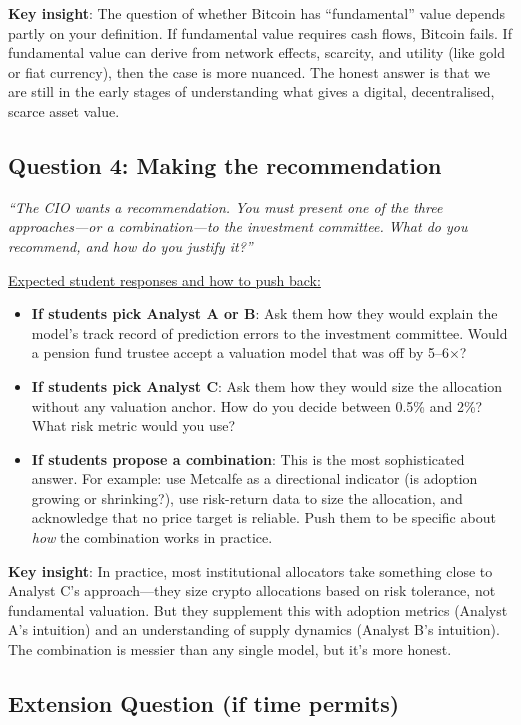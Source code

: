 \documentclass[11pt]{article}
\begin{document}
\medskip
\noindent\textbf{Key insight}: The question of whether Bitcoin has ``fundamental'' value depends partly on your definition. If fundamental value requires cash flows, Bitcoin fails. If fundamental value can derive from network effects, scarcity, and utility (like gold or fiat currency), then the case is more nuanced. The honest answer is that we are still in the early stages of understanding what gives a digital, decentralised, scarce asset value.

\subsection*{Question 4: Making the recommendation}

\textit{``The CIO wants a recommendation. You must present one of the three approaches---or a combination---to the investment committee. What do you recommend, and how do you justify it?''}

\medskip
\noindent\underline{Expected student responses and how to push back:}
\begin{itemize}[leftmargin=*]
\item \textbf{If students pick Analyst A or B}: Ask them how they would explain the model's track record of prediction errors to the investment committee. Would a pension fund trustee accept a valuation model that was off by 5--6$\times$?
\item \textbf{If students pick Analyst C}: Ask them how they would size the allocation without any valuation anchor. How do you decide between 0.5\% and 2\%? What risk metric would you use?
\item \textbf{If students propose a combination}: This is the most sophisticated answer. For example: use Metcalfe as a directional indicator (is adoption growing or shrinking?), use risk-return data to size the allocation, and acknowledge that no price target is reliable. Push them to be specific about \textit{how} the combination works in practice.
\end{itemize}

\medskip
\noindent\textbf{Key insight}: In practice, most institutional allocators take something close to Analyst C's approach---they size crypto allocations based on risk tolerance, not fundamental valuation. But they supplement this with adoption metrics (Analyst A's intuition) and an understanding of supply dynamics (Analyst B's intuition). The combination is messier than any single model, but it's more honest.

\subsection*{Extension Question (if time permits)}
\end{document}
